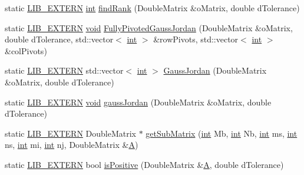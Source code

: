 \begin{DoxyCompactItemize}
\item 
static \hyperlink{libutil_8h_a48cc004c21e097c0d7c1c5fa8dc03b96}{L\+I\+B\+\_\+\+E\+X\+T\+E\+RN} \hyperlink{lp__lib_8h_adeb9ec6400320e4923ac9d836d509ddb}{int} \hyperlink{class_l_i_b___l_a_1_1_util_a563218650851d8c02606f3e7beadb105}{find\+Rank} (Double\+Matrix \&o\+Matrix, double d\+Tolerance)
\item 
static \hyperlink{libutil_8h_a48cc004c21e097c0d7c1c5fa8dc03b96}{L\+I\+B\+\_\+\+E\+X\+T\+E\+RN} \hyperlink{lp__lib_8h_ac7828c7b2b31d2e11af17bdb6289c5d9}{void} \hyperlink{class_l_i_b___l_a_1_1_util_af5eef89fa6d8db717be7b0a0079e67e3}{Fully\+Pivoted\+Gauss\+Jordan} (Double\+Matrix \&o\+Matrix, double d\+Tolerance, std\+::vector$<$ \hyperlink{lp__lib_8h_adeb9ec6400320e4923ac9d836d509ddb}{int} $>$ \&row\+Pivots, std\+::vector$<$ \hyperlink{lp__lib_8h_adeb9ec6400320e4923ac9d836d509ddb}{int} $>$ \&col\+Pivots)
\item 
static \hyperlink{libutil_8h_a48cc004c21e097c0d7c1c5fa8dc03b96}{L\+I\+B\+\_\+\+E\+X\+T\+E\+RN} std\+::vector$<$ \hyperlink{lp__lib_8h_adeb9ec6400320e4923ac9d836d509ddb}{int} $>$ \hyperlink{class_l_i_b___l_a_1_1_util_aacf9ed799e3ffd8a1851b8561c9e9a98}{Gauss\+Jordan} (Double\+Matrix \&o\+Matrix, double d\+Tolerance)
\item 
static \hyperlink{libutil_8h_a48cc004c21e097c0d7c1c5fa8dc03b96}{L\+I\+B\+\_\+\+E\+X\+T\+E\+RN} \hyperlink{lp__lib_8h_ac7828c7b2b31d2e11af17bdb6289c5d9}{void} \hyperlink{class_l_i_b___l_a_1_1_util_a3d6b07b92ce179feee86275b11bf0156}{gauss\+Jordan} (Double\+Matrix \&o\+Matrix, double d\+Tolerance)
\item 
static \hyperlink{libutil_8h_a48cc004c21e097c0d7c1c5fa8dc03b96}{L\+I\+B\+\_\+\+E\+X\+T\+E\+RN} Double\+Matrix $\ast$ \hyperlink{class_l_i_b___l_a_1_1_util_a0d06eafe51c31b95e461733b06c11d40}{get\+Sub\+Matrix} (\hyperlink{lp__lib_8h_adeb9ec6400320e4923ac9d836d509ddb}{int} Mb, \hyperlink{lp__lib_8h_adeb9ec6400320e4923ac9d836d509ddb}{int} Nb, \hyperlink{lp__lib_8h_adeb9ec6400320e4923ac9d836d509ddb}{int} ms, \hyperlink{lp__lib_8h_adeb9ec6400320e4923ac9d836d509ddb}{int} ns, \hyperlink{lp__lib_8h_adeb9ec6400320e4923ac9d836d509ddb}{int} mi, \hyperlink{lp__lib_8h_adeb9ec6400320e4923ac9d836d509ddb}{int} nj, Double\+Matrix \&\hyperlink{fmt_8h_a955f504eccf76b4eb2489c0adab03121}{A})
\item 
static \hyperlink{libutil_8h_a48cc004c21e097c0d7c1c5fa8dc03b96}{L\+I\+B\+\_\+\+E\+X\+T\+E\+RN} bool \hyperlink{class_l_i_b___l_a_1_1_util_a2104ea0df84df1aad921d4dfad1249ac}{is\+Positive} (Double\+Matrix \&\hyperlink{fmt_8h_a955f504eccf76b4eb2489c0adab03121}{A}, double d\+Tolerance)

\end{DoxyCompactItemize}
